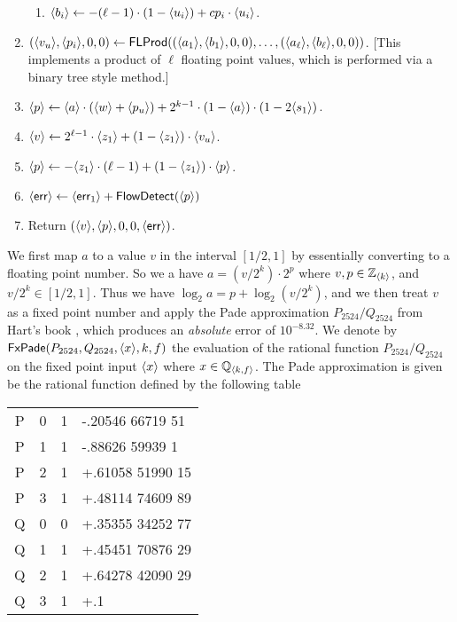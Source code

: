 \begin{enumerate}
\begin{enumerate}
  \item $\langle b_i \rangle \leftarrow -(\ell-1) \cdot (1-\langle u_i \rangle)+cp_i \cdot \langle u_i \rangle$.
\end{enumerate}
\item $(\langle v_u \rangle,\langle p_i \rangle,0,0)
	\leftarrow \mathsf{FLProd}((\langle a_1 \rangle,\langle b_1 \rangle,0,0), \ldots,
	                     (\langle a_\ell \rangle,\langle b_\ell \rangle,0,0))$. 
			     [This implements a product of $\ell$ floating point values, which is
			      performed via a binary tree style method.]
\item $\langle p \rangle \leftarrow \langle a \rangle \cdot (\langle w \rangle+\langle p_u \rangle)
			+2^{k-1}\cdot (1-\langle a \rangle) \cdot (1-2 \langle s_1 \rangle)$.
\item $\langle v \rangle \leftarrow 2^{\ell-1} \cdot \langle z_1 \rangle+(1-\langle z_1 \rangle) \cdot \langle v_u \rangle$.
\item $\langle p \rangle \leftarrow -\langle z_1 \rangle \cdot (\ell-1)
			+(1-\langle z_1 \rangle) \cdot \langle p \rangle$.
\item $\langle \mathsf{err} \rangle \leftarrow \langle \mathsf{err}_1 \rangle +  \mathsf{FlowDetect}(\langle p \rangle)$
\item Return $(\langle v \rangle,\langle p \rangle,0,0,\langle \mathsf{err} \rangle)$.
\end{enumerate}

We first map $a$ to a value $v$ in the interval $[1/2,1]$ by essentially
converting to a floating point number.
So we a have $a=(v/2^k) \cdot 2^p$ where $v, p \in {\mathbb{Z}}_{\langle k \rangle}$,
and $v/2^k \in [1/2,1]$.
Thus we have 
$\log_2 a = p+\log_2 (v/2^k)$, and we then treat $v$ as a fixed
point number and apply the Pade approximation $P_{2524}/Q_{2524}$
from Hart's book \cite{Hart:1978:CA:540084},
which produces an {\em absolute} error of $10^{-8.32}$.
We denote by $\mathsf{FxPade}(P_{2524},Q_{2524},\langle x \rangle,k,f)$ the evaluation
of the rational function $P_{2524}/Q_{2524}$ on the fixed point input $\langle x \rangle$
where $x \in {\mathbb{Q}}_{\langle k, f \rangle}$.
The Pade approximation is given be the rational function defined
by the following table
\begin{center}
\begin{tabular}{|c|c|c|l|}
\hline
P & 0 & 1  & -.20546 66719 51 \\
P & 1 & 1  & -.88626 59939 1 \\
P & 2 & 1  & +.61058 51990 15 \\
P & 3 & 1  & +.48114 74609 89 \\ 
Q & 0 & 0  & +.35355 34252 77 \\ 
Q & 1 & 1  & +.45451 70876 29  \\
Q & 2 & 1  & +.64278 42090 29 \\ 
Q & 3 & 1  & +.1 \\ 
\hline
\end{tabular}
\end{center}

